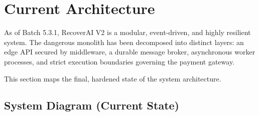 
\section{Current Architecture}

\begin{tcolorbox}[summarybox={\iconGear[1.5] The Hardened System}]
\color{textdark}
As of Batch 5.3.1, RecoverAI V2 is a modular, event-driven, and highly resilient system. The dangerous monolith has been decomposed into distinct layers: an edge API secured by middleware, a durable message broker, asynchronous worker processes, and strict execution boundaries governing the payment gateway.

This section maps the final, hardened state of the system architecture.
\end{tcolorbox}

\vspace{0.8cm}

\subsection{System Diagram (Current State)}

